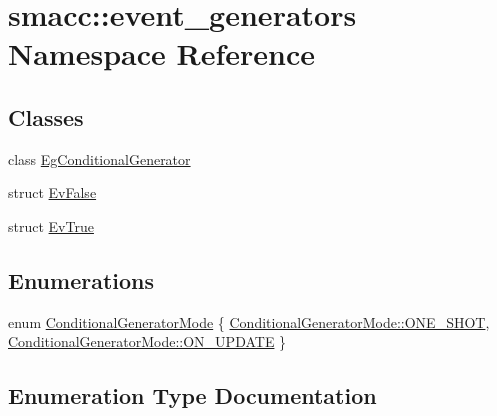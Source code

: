 \hypertarget{namespacesmacc_1_1event__generators}{}\section{smacc\+:\+:event\+\_\+generators Namespace Reference}
\label{namespacesmacc_1_1event__generators}
\subsection*{Classes}
\begin{DoxyCompactItemize}
\item 
class \hyperlink{classsmacc_1_1event__generators_1_1EgConditionalGenerator}{Eg\+Conditional\+Generator}
\item 
struct \hyperlink{structsmacc_1_1event__generators_1_1EvFalse}{Ev\+False}
\item 
struct \hyperlink{structsmacc_1_1event__generators_1_1EvTrue}{Ev\+True}
\end{DoxyCompactItemize}
\subsection*{Enumerations}
\begin{DoxyCompactItemize}
\item 
enum \hyperlink{namespacesmacc_1_1event__generators_a1a57548759d7458f91c299f4fc2c5ea4}{Conditional\+Generator\+Mode} \{ \hyperlink{namespacesmacc_1_1event__generators_a1a57548759d7458f91c299f4fc2c5ea4a5bc2964599423c796ecf0aaecdc5be9d}{Conditional\+Generator\+Mode\+::\+O\+N\+E\+\_\+\+S\+H\+OT}, 
\hyperlink{namespacesmacc_1_1event__generators_a1a57548759d7458f91c299f4fc2c5ea4a4a6be4c8602d150038b100a35556d3d7}{Conditional\+Generator\+Mode\+::\+O\+N\+\_\+\+U\+P\+D\+A\+TE}
 \}
\end{DoxyCompactItemize}


\subsection{Enumeration Type Documentation}
\mbox{\label{namespacesmacc_1_1event__generators_a1a57548759d7458f91c299f4fc2c5ea4}} 
